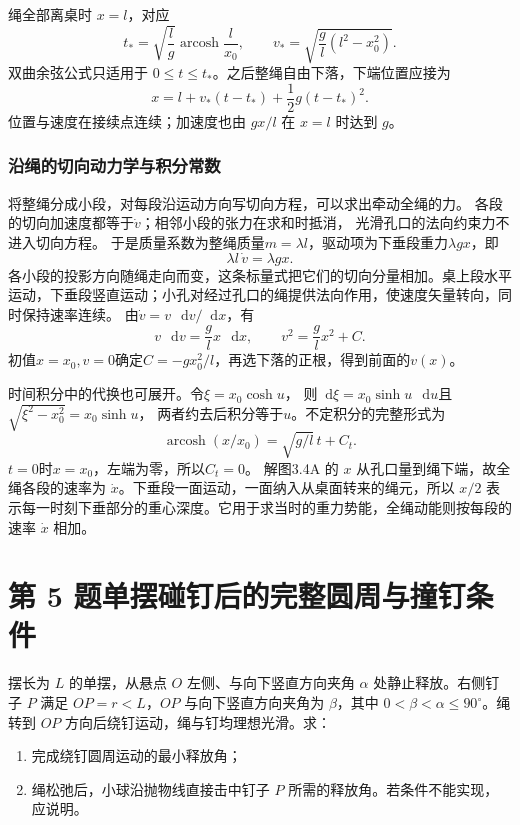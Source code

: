 \documentclass[UTF8,fontset=fandol,a4paper,11pt]{ctexart}
\newcommand{\dd}{\mathop{}\!\mathrm{d}}
\newcommand{\tagline}[1]{\noindent{\small\color{muted}#1}\par}
\begin{document}
绳全部离桌时 $x=l$，对应
\[
t_*=\sqrt{\frac lg}\operatorname{arcosh}\frac l{x_0},\qquad
v_*=\sqrt{\frac gl(l^2-x_0^2)}.
\]
双曲余弦公式只适用于 $0\leq t\leq t_*$。之后整绳自由下落，下端位置应接为
\[
x=l+v_*(t-t_*)+\frac12g(t-t_*)^2.
\]
位置与速度在接续点连续；加速度也由 $gx/l$ 在 $x=l$ 时达到 $g$。
\subsubsection*{沿绳的切向动力学与积分常数}
将整绳分成小段，对每段沿运动方向写切向方程，可以求出牵动全绳的力。
各段的切向加速度都等于$\dot v$；相邻小段的张力在求和时抵消，
光滑孔口的法向约束力不进入切向方程。
于是质量系数为整绳质量$m=\lambda l$，驱动项为下垂段重力$\lambda gx$，即
\[
\lambda l\,\dot v=\lambda gx.
\]
各小段的投影方向随绳走向而变，这条标量式把它们的切向分量相加。桌上段水平运动，下垂段竖直运动；小孔对经过孔口的绳提供法向作用，使速度矢量转向，同时保持速率连续。
由$\dot v=v\,\dd v/\dd x$，有
\[
v\,\dd v=\frac glx\,\dd x,
\qquad v^2=\frac glx^2+C.
\]
初值$x=x_0,v=0$确定$C=-gx_0^2/l$，再选下落的正根，得到前面的$v(x)$。

时间积分中的代换也可展开。令$\xi=x_0\cosh u$，
则$\dd\xi=x_0\sinh u\,\dd u$且$\sqrt{\xi^2-x_0^2}=x_0\sinh u$，
两者约去后积分等于$u$。不定积分的完整形式为
\[
\operatorname{arcosh}(x/x_0)=\sqrt{g/l}\,t+C_t.
\]
$t=0$时$x=x_0$，左端为零，所以$C_t=0$。
解图3.4A 的 $x$ 从孔口量到绳下端，故全绳各段的速率为 $\dot x$。下垂段一面运动，一面纳入从桌面转来的绳元，所以 $x/2$ 表示每一时刻下垂部分的重心深度。它用于求当时的重力势能，全绳动能则按每段的速率 $\dot x$ 相加。




\section*{第 5 题\quad 单摆碰钉后的完整圆周与撞钉条件}

\tagline{M-03-05}

摆长为 $L$ 的单摆，从悬点 $O$ 左侧、与向下竖直方向夹角 $\alpha$ 处静止释放。右侧钉子 $P$ 满足 $OP=r<L$，$OP$ 与向下竖直方向夹角为 $\beta$，其中 $0<\beta<\alpha\leq90^\circ$。绳转到 $OP$ 方向后绕钉运动，绳与钉均理想光滑。求：\begin{enumerate}\item 完成绕钉圆周运动的最小释放角；\item 绳松弛后，小球沿抛物线直接击中钉子 $P$ 所需的释放角。若条件不能实现，应说明。\end{enumerate}
\end{document}
